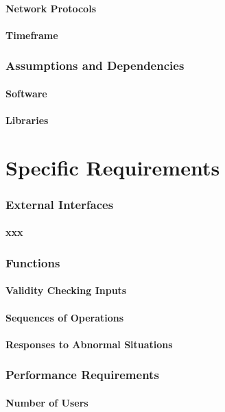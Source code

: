 \documentclass[11pt]{article}
\begin{document}
\subsection{Network Protocols}
\subsection{Timeframe}
\section{Assumptions and Dependencies}
\subsection{Software}
\subsection{Libraries}


\newpage
\part{Specific Requirements}
\section{External Interfaces}
\subsection{xxx}
\section{Functions}
\subsection{Validity Checking Inputs}
\subsection{Sequences of Operations}
\subsection{Responses to Abnormal Situations}
\section{Performance Requirements}
\subsection{Number of Users}
\end{document}
